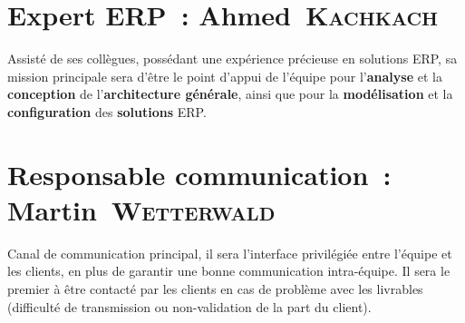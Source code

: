 \section{Expert ERP~: Ahmed~\textsc{Kachkach}}
Assisté de ses collègues, possédant une expérience précieuse en solutions ERP, sa mission principale sera d'être le point d'appui de l'équipe pour l'\textbf{analyse} et la \textbf{conception} de l'\textbf{architecture générale}, ainsi que pour la \textbf{modélisation} et la \textbf{configuration} des \textbf{solutions} ERP.

\section{Responsable communication~: Martin~\textsc{Wetterwald}}
Canal de communication principal, il sera l'interface privilégiée entre l'équipe et les clients, en plus de garantir une bonne communication intra-équipe. Il sera le premier à être contacté par les clients en cas de problème avec les livrables (difficulté de transmission ou non-validation de la part du client).


